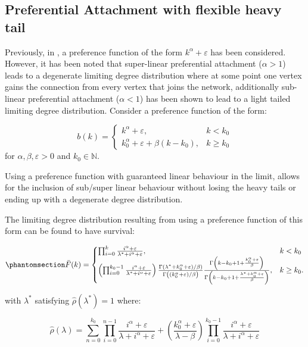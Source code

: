 \documentclass[
  sn-basic,
]{sn-jnl}
\theoremstyle{plain}
\theoremstyle{remark}
\begin{document}
\subsection{Preferential Attachment with flexible heavy
tail}\label{sec-model}

Previously, in \citep{krapivsky01}, a preference function of the form
\(k^\alpha +\varepsilon\) has been considered. However, it has been
noted that super-linear preferential attachment (\(\alpha > 1\)) leads
to a degenerate limiting degree distribution where at some point one
vertex gains the connection from every vertex that joins the network,
additionally sub-linear preferential attachment (\(\alpha <1\)) has been
shown to lead to a light tailed limiting degree distribution. Consider a
preference function of the form:

\[
b(k) = \begin{cases}
k^\alpha + \varepsilon,&k<k_0\\
k_0^\alpha + \varepsilon + \beta(k-k_0), &k\ge k_0
\end{cases}
\] for \(\alpha,\beta, \varepsilon>0\) and \(k_0\in\mathbb N\).

Using a preference function with guaranteed linear behaviour in the
limit, allows for the inclusion of sub/super linear behaviour without
losing the heavy tails or ending up with a degenerate degree
distribution.

The limiting degree distribution resulting from using a preference
function of this form can be found to have survival:

\begin{equation}\phantomsection\label{eq-polysurv}{
\bar F(k) = \begin{cases}
\prod_{i=0}^{k}\frac{i^\alpha + \varepsilon}{\lambda^*+i^\alpha + \varepsilon},&k<k_0\\
\left(\prod_{i=0}^{k_0-1}\frac{i^\alpha + \varepsilon}{\lambda^*+i^\alpha + \varepsilon}\right)\frac{\Gamma(\lambda^*+k_0^\alpha + \varepsilon)/\beta)}{\Gamma\left((k_0^\alpha + \varepsilon)/\beta\right)} \frac{\Gamma\left(k-k_0 + 1 +\frac{k_0^\alpha + \varepsilon}{\beta}\right)}{\Gamma\left(k-k_0 + 1 +\frac{\lambda^* +k_0^\alpha + \varepsilon}{\beta}\right)},&k\ge k_0.
\end{cases}
}\end{equation}

with \(\lambda^*\) satisfying \(\hat \rho(\lambda^*)=1\) where:

\[
\hat\rho(\lambda) = \sum_{n=0}^{k_0}\prod_{i=0}^{n-1}\frac{i^\alpha + \varepsilon}{\lambda+i^\alpha + \varepsilon} + \left(\frac{k_0^\alpha + \varepsilon}{\lambda-\beta}\right)\prod_{i=0}^{k_0-1}\frac{i^\alpha + \varepsilon}{\lambda + i^\alpha + \varepsilon} 
\]
\end{document}
